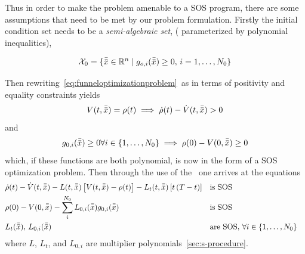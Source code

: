 Thus in order to make the problem amenable to a \ac{SOS} program, there are some
assumptions that need to be met by our problem formulation. Firstly the initial
condition set needs to be a \textit{semi-algebraic set}, (\ie{} parameterized by
polynomial inequalities),

\begin{equation}
  \mathcal{X}_0 = \lbrace\bar{\bar{x}} \in \mathbb{R}^n \mid g_{o,i}(\bar{\bar{x}}) \geq 0, \, i = 1,\ldots,N_0\rbrace
\end{equation}

Then rewriting~\cref{eq:funneloptimizationproblem}~as in terms of positivity and
equality constraints yields
\begin{equation}
  V(t,\bar{\bar{x}}) = \rho(t) \implies \dot{\rho}(t) - \dot{V}(t,\bar{\bar{x}}) > 0
\end{equation}
and
\begin{equation}
  g_{0,i}(\bar{\bar{x}}) \geq 0 \forall i \in \lbrace1,\ldots,N_0\rbrace \implies \rho(0) - V(0,\bar{\bar{x}}) \geq 0
\end{equation}
which, if these functions are both polynomial, is now in the form of a \ac{SOS}
optimization problem. Then through the use of the~ one
arrives at the equations
\begin{align}
  &\dot{\rho}(t) - \dot{V}(t,\bar{\bar{x}}) - L(t,\bar{\bar{x}})\left[ V(t,\bar{\bar{x}}) - \rho(t) \right] - L_{t}(t,\bar{\bar{x}})\left[ t\left( T - t \right) \right]  && \text{is SOS}& \label{eq:sufficient-conditions}\\
  & \rho(0) - V(0,\bar{\bar{x}}) - \sum_{i}^{N_{0}} L_{0,i}(\bar{\bar{x}})g_{0,i}(\bar{\bar{x}}) && \text{is SOS}& \\
  & L_{t}(\bar{\bar{x}}), \, L_{0,i}(\bar{\bar{x}}) \; &&\text{are SOS}, \, \forall i \in \lbrace1,\ldots,N_{0}\rbrace \label{eq:sufficient-conditions3} \\
\end{align} 
where \(L\), \(L_{t}\), and \(L_{0,i}\) are multiplier
polynomials~\cref{sec:s-procedure}.

